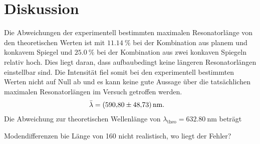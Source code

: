 \section{Diskussion}
\label{sec:Diskussion}

Die Abweichungen der experimentell bestimmten maximalen Resonatorlänge von den theoretischen Werten ist mit $\qty{11.14}{\percent}$ bei der Kombination
aus planem und konkavem Spiegel und $\qty{25.0}{\percent}$ bei der Kombination aus zwei konkaven Spiegeln relativ hoch.
Dies liegt daran, dass aufbaubedingt keine längeren Resonatorlängen einstellbar sind. Die Intensität fiel somit bei den experimentell bestimmten
Werten nicht auf Null ab und es kann keine gute Aussage über die tatsächlichen maximalen Resonatorlängen im Versuch getroffen werden.\\



\begin{align*}
    \bar{\lambda} &= \qty{590.80 \pm 48.73}{\nano\meter}.
\end{align*}
Die Abweichung zur theoretischen Wellenlänge von $\lambda_{\text{theo}}= \qty{632.80}{\nano\meter}$ beträgt



Modendifferenzen bie Länge von 160 nicht realistisch, wo liegt der Fehler?